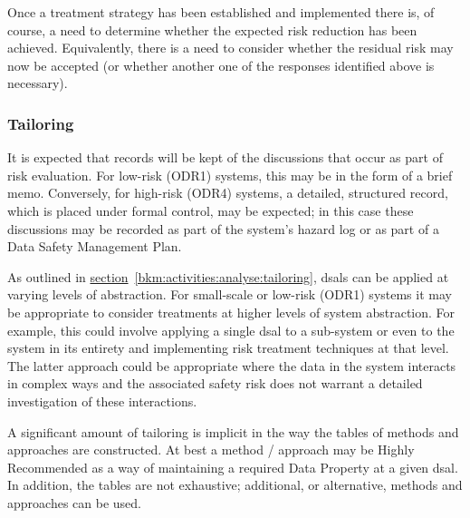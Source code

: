 Once a treatment strategy has been established and implemented there is, of course, a need to determine whether the expected risk reduction has been achieved. Equivalently, there is a need to consider whether the residual risk may now be accepted (or whether another one of the responses identified above is necessary).

\subsubsection{Tailoring}
It is expected that records will be kept of the discussions that occur as part of risk evaluation. For low-risk (ODR1) systems, this may be in the form of a brief memo. Conversely, for high-risk (ODR4) systems, a detailed, structured record, which is placed under formal control, may be expected; in this case these discussions may be recorded as part of the system's \gls{hazard log} or as part of a Data Safety Management Plan.

As outlined in
\hyperref[bkm:activities:analyse:tailoring]{section}~\ref{bkm:activities:analyse:tailoring}, %
\glspl{dsal} can be applied at varying levels of abstraction. For small-scale or low-risk (ODR1) systems it may be appropriate to consider treatments at higher levels of system abstraction. For example, this could involve applying a single \gls{dsal} to a sub-system or even to the system in its entirety and implementing risk treatment techniques at that level. The latter approach could be appropriate where the data in the system interacts in complex ways and the associated safety risk does not warrant a detailed investigation of these interactions.

A significant amount of tailoring is implicit in the way the tables of methods and approaches are constructed. At best a method / approach may be Highly Recommended as a way of maintaining a required Data Property at a given \gls{dsal}. In addition, the tables are not exhaustive; additional, or alternative, methods and approaches can be used.

